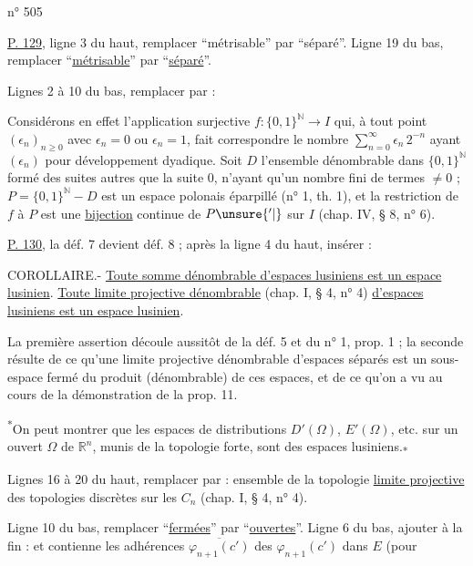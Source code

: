 \hfill n° 505

\uline{P. 129}, ligne 3 du haut, remplacer ``métrisable'' par ``séparé''. Ligne 19 du bas,
remplacer ``\uline{métrisable}'' par ``\uline{séparé}''.

Lignes 2 à 10 du bas, remplacer par :

Considérons en effet l'application surjective $f:\{0,1\}^{\mathbb N}\to I$ qui, à tout
point $(\epsilon_n)_{n\geq 0}$ avec $\epsilon_n=0$ ou $\epsilon_n=1$, fait correspondre le nombre
$\displaystyle\sum_{n=0}^{\infty}\epsilon_n\,2^{-n}$ ayant $(\epsilon_n)$ pour développement dyadique. Soit $D$ l'ensemble dénombrable dans $\{0,1\}^{\mathbb N}$ formé des suites autres que la suite $0$, n'ayant qu'un nombre fini de termes $\ne 0$ ; $P=\{0,1\}^{\mathbb N}-D$ est un espace polonais éparpillé (n° 1,
th. 1), et la restriction de $f$ à $P$ est une \uline{bijection} continue de $P\unsure{'|{}}$ sur $I$
(chap. IV, § 8, n° 6).

\uline{P. 130}, la déf. 7 devient déf. 8 ; après la ligne 4 du haut, insérer :

COROLLAIRE.- \uline{Toute somme dénombrable d'espaces lusiniens est un espace lusinien}.
\uline{Toute limite projective dénombrable} (chap. I, § 4, n° 4) \uline{d'espaces lusiniens est un espace lusinien}.

La première assertion découle aussitôt de la déf. 5 et du n° 1, prop. 1 ; la seconde résulte de ce qu'une limite projective dénombrable d'espaces séparés est un sous-espace fermé du produit (dénombrable) de ces espaces, et de ce qu'on a vu au cours de la démonstration de la prop. 11.

\textsuperscript{*}On peut montrer que les espaces de distributions $D'(\Omega)$, $E'(\Omega)$, etc. sur un ouvert $\Omega$ de $\mathbb R^n$, munis de la topologie forte, sont des espaces lusiniens.\textsubscript{*}

Lignes 16 à 20 du haut, remplacer par : ensemble de la topologie \uline{limite projective} des topologies discrètes sur les $C_n$ (chap. I, § 4, n° 4).

Ligne 10 du bas, remplacer ``\uline{fermées}'' par ``\uline{ouvertes}''. Ligne 6 du bas, ajouter à la fin : et contienne les adhérences $\overline{\varphi_{n+1}(c')}$ des $\varphi_{n+1}(c')$ dans $E$ (pour
